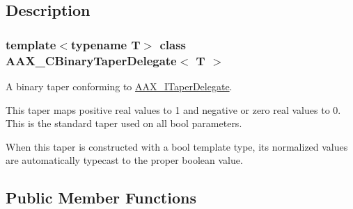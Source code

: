 \subsection{Description}
\subsubsection*{template$<$typename T$>$\newline
class A\+A\+X\+\_\+\+C\+Binary\+Taper\+Delegate$<$ T $>$}

A binary taper conforming to \mbox{\hyperlink{a01881}{A\+A\+X\+\_\+\+I\+Taper\+Delegate}}. 

This taper maps positive real values to 1 and negative or zero real values to 0. This is the standard taper used on all bool parameters.

When this taper is constructed with a bool template type, its normalized values are automatically typecast to the proper boolean value. \subsection*{Public Member Functions}
